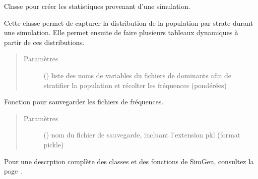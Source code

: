 \documentclass[letterpaper,10pt,french]{sphinxmanual}
\begin{document}
\begin{fulllineitems}
\label{\detokenize{utilisation:id5}}
Classe pour créer les statistiques provenant d’une simulation.

Cette classe permet de capturer la distribution de la population par strate durant une simulation. Elle permet ensuite de faire plusieurs tableaux dynamiques à partir de ces distributions.
\begin{quote}\begin{description}
\item[{Paramètres}] \leavevmode
{} () \textendash{} liste des noms de variables du fichiers de dominants afin de stratifier la population et récolter les fréquences (pondérées)

\end{description}\end{quote}

\begin{fulllineitems}
\label{\detokenize{utilisation:simgen.statistics.save}}
Fonction pour sauvegarder les fichiers de fréquences.
\begin{quote}\begin{description}
\item[{Paramètres}] \leavevmode
{} () \textendash{} nom du fichier de sauvegarde, incluant l’extension pkl (format pickle)

\end{description}\end{quote}

\end{fulllineitems}


\end{fulllineitems}


\begin{DUlineblock}{0em}
\item[] 
\end{DUlineblock}

Pour une descrption complète des classes et des fonctions de SimGen, consultez la page {\hyperref[\detokenize{code:code}]{}}.
\end{document}
